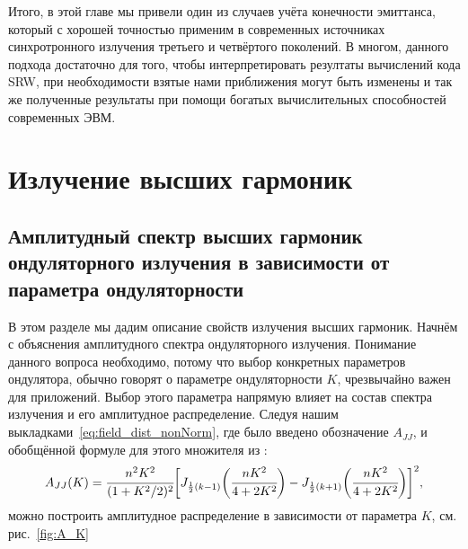 Итого, в этой главе мы привели один из случаев учёта конечности эмиттанса, который с хорошей точностью применим в современных источниках синхротронного излучения третьего и четвёртого поколений. В многом, данного подхода достаточно для того, чтобы интерпретировать резултаты вычислений кода SRW, при необходимости взятые нами приближения могут быть изменены и так же полученные результаты при помощи богатых вычислительных способностей современных ЭВМ.

\section{Излучение высших гармоник}
\subsection{Амплитудный спектр высших гармоник ондуляторного излучения в зависимости от параметра ондуляторности}
В этом разделе мы дадим описание свойств излучения высших гармоник. Начнём с объяснения амплитудного спектра ондуляторного излучения. Понимание данного вопроса необходимо, потому что выбор конкретных параметров ондулятора, обычно говорят о параметре ондуляторности $K$, чрезвычайно важен для приложений. Выбор этого параметра напрямую влияет на состав спектра излучения и его амплитудное распределение. Следуя нашим выкладками~\ref{eq:field_dist_nonNorm}, где было введено обозначение $A_{JJ}$, и обобщённой формуле для этого множителя из \cite{wiedemann2015particle}:
\begin{equation}
	\label{eq:A_JJ}
	A_{JJ}(K) = \cfrac{n^2 K^2}{(1 + K^2/2)^2} \bigg[ J_{\frac{1}{2}(k-1)}\bigg(\cfrac{nK^2}{4 + 2K^2}\bigg) - J_{\frac{1}{2}(k+1)}\bigg(\cfrac{nK^2}{4 + 2K^2}\bigg)\bigg]^2,
\end{equation}
можно построить амплитудное распределение в зависимости от параметра $K$, см. рис.~\ref{fig:A_K}
